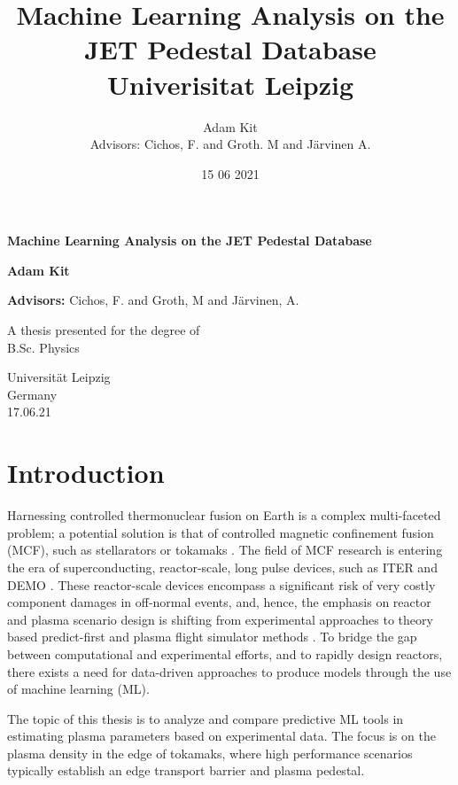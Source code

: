 \documentclass[a4paper, twoside, final, 12pt]{article}
\title{
	{Machine Learning Analysis on the JET Pedestal Database } \vspace{0.5cm}
	{\large Univerisitat Leipzig} \\ 
	}
\author{Adam Kit \\{\small Advisors: Cichos, F. and Groth. M and Järvinen A.}}
\date{15 06 2021}
\begin{document}
\begin{titlepage}
   \begin{center}
       \vspace*{1cm}

       \textbf{Machine Learning Analysis on the JET Pedestal Database }

       \vspace{1.5cm}

       \textbf{Adam Kit}
       
       \vspace{0.5cm}
       \textbf{Advisors:} Cichos, F. and Groth, M and Järvinen, A.

       \vfill
            
       A thesis presented for the degree of\\
       B.Sc. Physics
            
       \vspace{0.8cm}
     
            
       Universität Leipzig\\
       Germany\\
       17.06.21
            
   \end{center}
\end{titlepage}
    \newpage
    \tableofcontents
    \newpage
\section{Introduction}\label{sec:introduction}
Harnessing controlled thermonuclear fusion on Earth is a complex multi-faceted problem; a potential solution is that of controlled magnetic confinement fusion (MCF), such as stellarators or tokamaks \cite{EUROfusionroadmap}. 
The field of MCF research is entering the era of superconducting, reactor-scale, long pulse devices, such as ITER and DEMO \cite{Ikeda_2007, stepladder}.
These reactor-scale devices encompass a significant risk of very costly component damages in off-normal events, and, hence, the emphasis on reactor and plasma scenario design is shifting from experimental approaches to theory based predict-first and plasma flight simulator methods \cite{Meneghini_2017, MOREAU2011535}.
To  bridge  the  gap  between computational and experimental efforts, and to rapidly design reactors, there exists a need for data-driven approaches to produce models through the use of machine learning (ML). 

The topic of this thesis is to analyze and compare predictive ML tools in estimating plasma parameters based on experimental data. The focus is on the plasma density in the edge of tokamaks, where high performance scenarios typically establish an edge transport barrier and plasma pedestal. 
\end{document}
